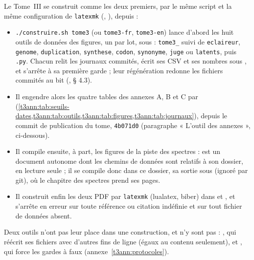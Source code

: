 Le Tome~III se construit comme les deux premiers, par le même script et la même configuration de \texttt{latexmk} (, ), depuis  :
\begin{itemize}
\item \texttt{./construire.sh tome3} (ou \texttt{tome3-fr}, \texttt{tome3-en}) lance d'abord les huit outils de données des figures, un par lot, sous  : \texttt{tome3\_} suivi de \texttt{eclaireur}, \texttt{genome}, \texttt{duplication}, \texttt{synthese}, \texttt{codon}, \texttt{synonyme}, \texttt{juge} ou \texttt{latents}, puis \texttt{.py}. Chacun relit les journaux commités, écrit ses CSV et ses nombres sous , et s'arrête à sa première garde ; leur régénération redonne les fichiers commités au bit (, § 4.3).
\item Il engendre alors les quatre tables des annexes A, B et C par  (\cref{t3ann:tab:seuils-dates,t3ann:tab:outils,t3ann:tab:figures,t3ann:tab:journaux}), depuis le commit  de publication du tome, \texttt{4b071d0} (paragraphe « L'outil des annexes », ci-dessous).
\item Il compile ensuite, à part, les figures de la piste des spectres :  est un document autonome dont les chemins de données sont relatifs à son dossier, en lecture seule ; il se compile donc dans ce dossier, sa sortie sous  (ignoré par git), où le chapitre des spectres prend ses pages.
\item Il construit enfin les deux PDF par \texttt{latexmk} (lualatex, biber) dans  et , et s'arrête en erreur sur toute référence ou citation indéfinie et sur tout fichier de données absent.
\end{itemize}
Deux outils n'ont pas leur place dans une construction, et n'y sont pas : , qui réécrit ses fichiers avec d'autres fins de ligne (égaux au contenu seulement), et , qui force les gardes à faux (annexe~\ref{t3ann:protocoles}).


